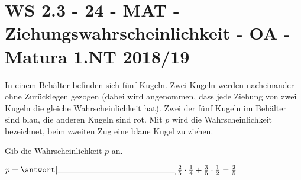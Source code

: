 \section{WS 2.3 - 24 - MAT - Ziehungswahrscheinlichkeit - OA - Matura 1.NT 2018/19}

\begin{beispiel}[WS 2.3]{1}
In einem Behälter befinden sich fünf Kugeln. Zwei Kugeln werden nacheinander ohne Zurücklegen gezogen (dabei wird angenommen, dass jede Ziehung von zwei Kugeln die gleiche Wahrscheinlichkeit hat). Zwei der fünf Kugeln im Behälter sind blau, die anderen Kugeln sind rot. Mit $p$ wird die Wahrscheinlichkeit bezeichnet, beim zweiten Zug eine blaue Kugel zu ziehen.

Gib die Wahrscheinlichkeit $p$ an.\leer

$p=\antwort[\rule{5cm}{0.3pt}]{\frac{2}{5}\cdot\frac{1}{4}+\frac{3}{5}\cdot\frac{1}{2}=\frac{2}{5}}$
\end{beispiel}